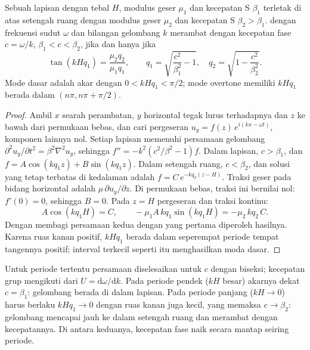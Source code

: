 \begin{theorem}\label{thm:b3:seismology-imaging:love}
Sebuah lapisan dengan tebal $H$, modulus geser $\mu_1$ dan kecepatan S $\beta_1$ terletak di atas
setengah ruang dengan modulus geser $\mu_2$ dan kecepatan S $\beta_2 > \beta_1$. 
dengan frekuensi sudut $\omega$ dan bilangan gelombang $k$ merambat dengan
kecepatan fase $c = \omega/k$, $\beta_1 < c < \beta_2$, jika dan hanya jika
\[
  \tan\!\left(kH q_1\right) = \frac{\mu_2 q_2}{\mu_1 q_1},
  \qquad q_1 = \sqrt{\frac{c^2}{\beta_1^2} - 1},\quad
  q_2 = \sqrt{1 - \frac{c^2}{\beta_2^2}} .
\]
Mode dasar adalah akar dengan $0 < kHq_1 < \pi/2$; mode overtone memiliki
$kHq_1$ berada dalam $(n\pi, n\pi + \pi/2)$.
\end{theorem}

\begin{proof}
Ambil $x$ searah perambatan, $y$ horizontal tegak lurus terhadapnya dan $z$ ke bawah dari
permukaan bebas, dan cari pergeseran
$u_y = f(z)\,e^{i(kx - \omega t)}$, komponen lainnya nol. Setiap lapisan
memenuhi persamaan gelombang $\partial^2 u_y/\partial t^2 = \beta^2\nabla^2 u_y$, sehingga
$f'' = -k^2\left(c^2/\beta^2 - 1\right) f$. Dalam lapisan, $c > \beta_1$, dan
$f = A\cos(kq_1z) + B\sin(kq_1z)$. Dalam setengah ruang, $c < \beta_2$, dan
solusi yang tetap terbatas di kedalaman adalah $f = C\,e^{-kq_2(z - H)}$.
Traksi geser pada bidang horizontal adalah $\mu\,\partial u_y/\partial z$.
Di permukaan bebas, traksi ini bernilai nol: $f'(0) = 0$, sehingga $B = 0$. Pada $z = H$
pergeseran dan traksi kontinu:
\[
  A\cos(kq_1H) = C, \qquad -\mu_1 A\,kq_1\sin(kq_1H) = -\mu_2\,kq_2\,C .
\]
Dengan membagi persamaan kedua dengan yang pertama diperoleh hasilnya. Karena
ruas kanan positif, $kHq_1$ berada dalam seperempat periode tempat
tangennya positif; interval terkecil seperti itu menghasilkan moda dasar.
\end{proof}

Untuk periode tertentu persamaan diselesaikan untuk $c$ dengan biseksi; kecepatan grup
mengikuti dari $U = \mathrm d\omega/\mathrm dk$. Pada periode pendek
($kH$ besar) akarnya dekat $c = \beta_1$: gelombang berada di dalam lapisan. Pada
periode panjang ($kH \to 0$) harus berlaku $kHq_1 \to 0$ dengan ruas kanan
juga kecil, yang memaksa $c \to \beta_2$: gelombang mencapai jauh ke dalam
setengah ruang dan merambat dengan kecepatannya. Di antara keduanya, kecepatan fase naik
secara mantap seiring periode.

